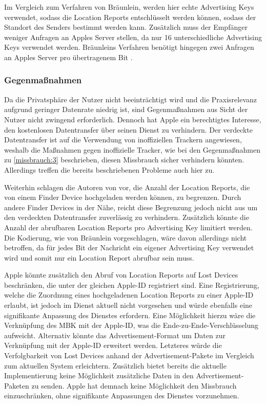 Im Vergleich zum Verfahren von Bräunlein, werden hier echte Advertising Keys verwendet, sodass die Location Reports entschlüsselt werden können, sodass der Standort des Senders bestimmt werden kann.
Zusätzlich muss der Empfänger weniger Anfragen an Apples Server stellen, da nur 16 unterschiedliche Advertising Keys verwendet werden.
Bräunleins Verfahren benötigt hingegen zwei Anfragen an Apples Server pro übertragenem Bit \cite{braeunlein_sendmy}.


\subsubsection{Gegenmaßnahmen}
Da die Privatsphäre der Nutzer nicht beeinträchtigt wird und die Praxisrelevanz aufgrund geringer Datenrate niedrig ist, sind Gegenmaßnahmen aus Sicht der Nutzer nicht zwingend erforderlich.
Dennoch hat Apple ein berechtigtes Interesse, den kostenlosen Datentransfer über seinen Dienst zu verhindern.
Der verdeckte Datentransfer ist auf die Verwendung von inoffiziellen Trackern angewiesen, weshalb die Maßnahmen gegen inoffizielle Tracker, wie bei den Gegenmaßnahmen zu \autoref{missbrauch:3} beschrieben, diesen Missbrauch sicher verhindern könnten.
Allerdings treffen die bereits beschriebenen Probleme auch hier zu.

Weiterhin schlagen die Autoren von \cite{Tonetto_FindMy} vor, die Anzahl der Location Reports, die von einem Finder Device hochgeladen werden können, zu begrenzen.
Durch andere Finder Devices in der Nähe, reicht diese Begrenzung jedoch nicht aus um den verdeckten Datentransfer zuverlässig zu verhindern.
Zusätzlich könnte die Anzahl der abrufbaren Location Reports pro Advertising Key limitiert werden.
Die Kodierung, wie von Bräunlein \cite{braeunlein_sendmy} vorgeschlagen, wäre davon allerdings nicht betroffen, da für jedes Bit der Nachricht ein eigener Advertising Key verwendet wird und somit nur ein Location Report abrufbar sein muss.

Apple könnte zusätzlich den Abruf von Location Reports auf Lost Devices beschränken, die unter der gleichen Apple-ID registriert sind.
Eine Registrierung, welche die Zuordnung eines hochgeladenen Location Reports zu einer Apple-ID erlaubt, ist jedoch im Dienst aktuell nicht vorgesehen und würde ebenfalls eine signifikante Anpassung des Dienstes erfordern.
Eine Möglichkeit hierzu wäre die Verknüpfung des \ac{MBK} mit der Apple-ID, was die Ende-zu-Ende-Verschlüsselung aufweicht.
Alternativ könnte das Advertisement-Format um Daten zur Verknüpfung mit der Apple-ID erweitert werden.
Letzteres würde die Verfolgbarkeit von Lost Devices anhand der Advertisement-Pakete im Vergleich zum aktuellen System erleichtern.
Zusätzlich bietet bereits die aktuelle Implementierung keine Möglichkeit zusätzliche Daten in den Advertisement-Paketen zu senden.
Apple hat demnach keine Möglichkeit den Missbrauch einzuschränken, ohne signifikante Anpassungen des Dienstes vorzunehmen.



